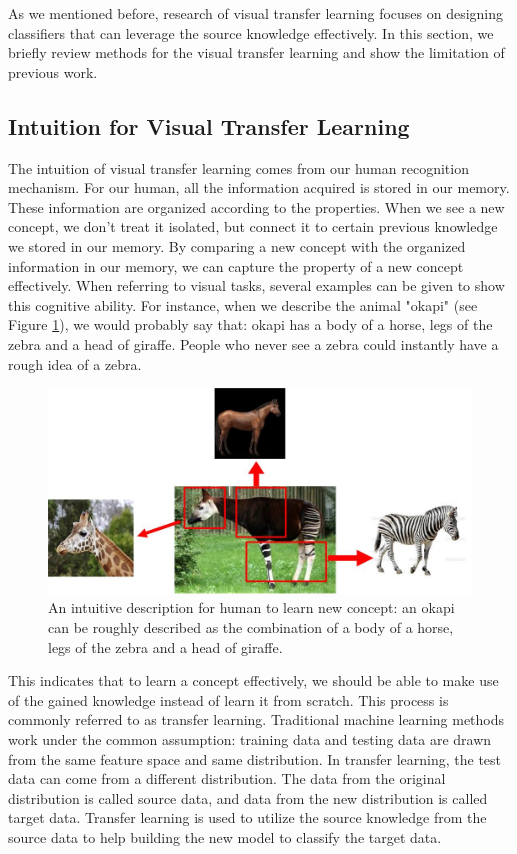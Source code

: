 As we mentioned before, research of visual transfer learning focuses on designing classifiers that can leverage the source knowledge effectively. In this section, we briefly review methods for the visual transfer learning and show the limitation of previous work. 
\subsection{Intuition for Visual Transfer Learning}
The intuition of visual transfer learning comes from our human recognition mechanism. For our human, all the information acquired is stored in our memory. These information are organized according to the properties. When we see a new concept, we don't treat it isolated, but connect it to certain previous knowledge we stored in our memory. By comparing a new concept with the organized information in our memory, we can capture the property of a new concept effectively. When referring to visual tasks, several examples can be given to show this cognitive ability. For instance, when we describe the animal "okapi" (see Figure \ref{fig:intro:multi}), we would probably say that: okapi has a body of a horse, legs of the zebra and a head of giraffe. People who never see a zebra could instantly have a rough idea of a zebra. 

\begin{figure}
	\centering
	\includegraphics[scale=.6]{introduction/fig/multiple.jpg}
	\caption{An intuitive description for human to learn new concept: an okapi can be roughly described as the combination of a body of a horse, legs of the zebra and a head of giraffe.}\label{fig:intro:multi}
\end{figure}

This indicates that to learn a concept effectively, we should be able to make use of the gained knowledge instead of learn it from scratch. This process is commonly referred to as transfer learning\cite{pan2010survey}. Traditional machine learning methods work under the common assumption: training data and testing data are drawn from the same feature space and same distribution. 
In transfer learning, the test data can come from a different distribution. The data from the original distribution is called source data, and data from the new distribution is called target data. Transfer learning is used to utilize the source knowledge from the source data to help building the new model to classify the target data. 

